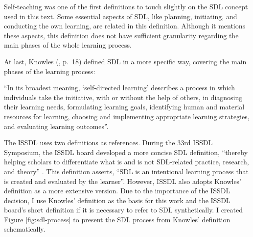 Self-teaching was one of the first definitions to touch slightly on the \gls{SDL} concept used in this text. Some essential aspects of \gls{SDL}, like planning, initiating, and conducting the own learning, are related in this definition. Although it mentions these aspects, this definition does not have sufficient granularity regarding the main phases of the whole learning process.

At last, Knowles (\citeyear{knowles:1975}, p.~18) defined \gls{SDL} in a more specific way, covering the main phases of the learning process:
\begin{citacao}
    “In its broadest meaning, ‘self-directed learning’ describes a process in which individuals take the initiative, with or without the help of others, in diagnosing their learning needs, formulating learning goals, identifying human and material resources for learning, choosing and implementing appropriate learning strategies, and evaluating learning outcomes”.
\end{citacao}

The \gls{ISSDL} uses two definitions as references. During the 33rd \gls{ISSDL} Symposium, the \gls{ISSDL} board developed a more concise \gls{SDL} definition, “thereby helping scholars to differentiate what is and is not \gls{SDL}-related practice, research, and theory” \cite{issdl:2020}.  This definition asserts, “\gls{SDL} is an intentional learning process that is created and evaluated by the learner”. However, \gls{ISSDL} also adopts Knowles’ definition as a more extensive version. Due to the importance of the \gls{ISSDL} decision, I use Knowles’ definition as the basis for this work and the \gls{ISSDL} board’s short definition if it is necessary to refer to \gls{SDL} synthetically. I created Figure \ref{fig:sdl-process} to present the \gls{SDL} process from Knowles’ definition schematically.

